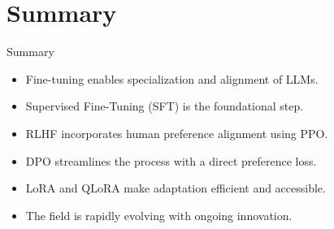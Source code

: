 \section{Summary}
\begin{frame}{Summary}
    \begin{itemize}
        \item Fine-tuning enables specialization and alignment of LLMs.
        \item Supervised Fine-Tuning (SFT) is the foundational step.
        \item RLHF incorporates human preference alignment using PPO.
        \item DPO streamlines the process with a direct preference loss.
        \item LoRA and QLoRA make adaptation efficient and accessible.
        \item The field is rapidly evolving with ongoing innovation.
    \end{itemize}
\end{frame}


